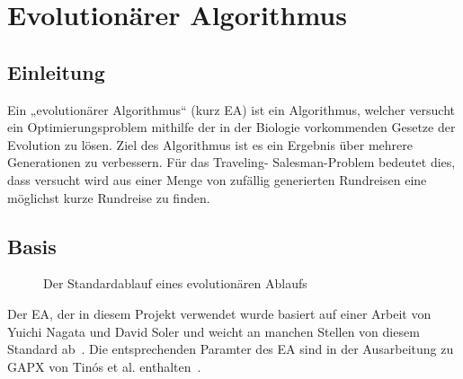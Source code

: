 \chapter{Evolutionärer Algorithmus}
\section{Einleitung}
Ein „evolutionärer Algorithmus“ (kurz EA) ist ein Algorithmus, welcher 
versucht ein Optimierungsproblem mithilfe der in der Biologie 
vorkommenden Gesetze der Evolution zu lösen. Ziel des Algorithmus ist es
ein Ergebnis über mehrere Generationen zu verbessern. Für das Traveling-
Salesman-Problem bedeutet dies, dass versucht wird aus einer Menge
von zufällig generierten Rundreisen eine möglichst kurze Rundreise zu
finden.

\section{Basis}

\begin{figure}[H]
\caption[Standardablauf eines evolutionären Algorithmus]{Der
  Standardablauf eines evolutionären Ablaufs}
\end{figure}
Der EA, der in diesem Projekt verwendet wurde basiert auf einer
Arbeit von Yuichi Nagata und David Soler und weicht an manchen
Stellen von diesem Standard ab~\cite{nagata}. Die entsprechenden
Paramter des EA sind in der Ausarbeitung zu GAPX von Tinós et al. 
enthalten~\cite{gapx}.

